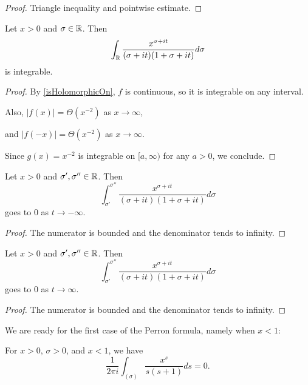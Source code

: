 \begin{proof}\leanok
{}


Triangle inequality and pointwise estimate.
\end{proof}


\begin{lemma}[isIntegrable]\label{isIntegrable}\leanok
Let $x>0$ and $\sigma\in\R$. Then
$$\int_{\R}\frac{x^{\sigma+it}}{(\sigma+it)(1+\sigma + it)}d\sigma$$
is integrable.
\end{lemma}


\begin{proof}\leanok
By \ref{isHolomorphicOn}, $f$ is continuous, so it is integrable on any interval.

 Also, $|f(x)| = \Theta(x^{-2})$ as $x\to\infty$,

 and $|f(-x)| = \Theta(x^{-2})$ as $x\to\infty$.

 Since $g(x) = x^{-2}$ is integrable on $[a,\infty)$ for any $a>0$, we conclude.

\end{proof}


\begin{lemma}\label{tendsto_zero_Lower}\leanok
Let $x>0$ and $\sigma',\sigma''\in\R$. Then
$$\int_{\sigma'}^{\sigma''}\frac{x^{\sigma+it}}{(\sigma+it)(1+\sigma + it)}d\sigma$$
goes to $0$ as $t\to-\infty$.
\end{lemma}


\begin{proof}\leanok
The numerator is bounded and the denominator tends to infinity.
\end{proof}


\begin{lemma}\label{tendsto_zero_Upper}\leanok
Let $x>0$ and $\sigma',\sigma''\in\R$. Then
$$\int_{\sigma'}^{\sigma''}\frac{x^{\sigma+it}}{(\sigma+it)(1+\sigma + it)}d\sigma$$
goes to $0$ as $t\to\infty$.
\end{lemma}


\begin{proof}\leanok
The numerator is bounded and the denominator tends to infinity.
\end{proof}


We are ready for the first case of the Perron formula, namely when $x<1$:
\begin{lemma}[formulaLtOne]\label{formulaLtOne}\leanok
For $x>0$, $\sigma>0$, and $x<1$, we have
$$
\frac1{2\pi i}
\int_{(\sigma)}\frac{x^s}{s(s+1)}ds =0.
$$
\end{lemma}


